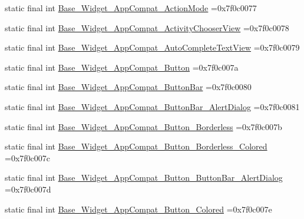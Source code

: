 \begin{DoxyCompactItemize}
\item 
static final int \mbox{\hyperlink{classbr_1_1unb_1_1cic_1_1mp_1_1marketmaster_1_1test_1_1R_1_1style_a55995a4583f924b91f4906774f512d5d}{Base\+\_\+\+Widget\+\_\+\+App\+Compat\+\_\+\+Action\+Mode}} =0x7f0c0077
\item 
static final int \mbox{\hyperlink{classbr_1_1unb_1_1cic_1_1mp_1_1marketmaster_1_1test_1_1R_1_1style_a267a3666f87776bc0512b00e93191914}{Base\+\_\+\+Widget\+\_\+\+App\+Compat\+\_\+\+Activity\+Chooser\+View}} =0x7f0c0078
\item 
static final int \mbox{\hyperlink{classbr_1_1unb_1_1cic_1_1mp_1_1marketmaster_1_1test_1_1R_1_1style_af5a89784aee8f12ae4f60f9d3be816c8}{Base\+\_\+\+Widget\+\_\+\+App\+Compat\+\_\+\+Auto\+Complete\+Text\+View}} =0x7f0c0079
\item 
static final int \mbox{\hyperlink{classbr_1_1unb_1_1cic_1_1mp_1_1marketmaster_1_1test_1_1R_1_1style_a5a38064a1f760f96a0865e2d7b9a7dd0}{Base\+\_\+\+Widget\+\_\+\+App\+Compat\+\_\+\+Button}} =0x7f0c007a
\item 
static final int \mbox{\hyperlink{classbr_1_1unb_1_1cic_1_1mp_1_1marketmaster_1_1test_1_1R_1_1style_a525de89adc90661cbf795bf72158d157}{Base\+\_\+\+Widget\+\_\+\+App\+Compat\+\_\+\+Button\+Bar}} =0x7f0c0080
\item 
static final int \mbox{\hyperlink{classbr_1_1unb_1_1cic_1_1mp_1_1marketmaster_1_1test_1_1R_1_1style_ae44658c3d7d5f4449ae26644ee1e8139}{Base\+\_\+\+Widget\+\_\+\+App\+Compat\+\_\+\+Button\+Bar\+\_\+\+Alert\+Dialog}} =0x7f0c0081
\item 
static final int \mbox{\hyperlink{classbr_1_1unb_1_1cic_1_1mp_1_1marketmaster_1_1test_1_1R_1_1style_a39ab6b7d3317e1f5e28e3bc9a770a8d1}{Base\+\_\+\+Widget\+\_\+\+App\+Compat\+\_\+\+Button\+\_\+\+Borderless}} =0x7f0c007b
\item 
static final int \mbox{\hyperlink{classbr_1_1unb_1_1cic_1_1mp_1_1marketmaster_1_1test_1_1R_1_1style_a39803577f8234d5b47a0d4446e20a478}{Base\+\_\+\+Widget\+\_\+\+App\+Compat\+\_\+\+Button\+\_\+\+Borderless\+\_\+\+Colored}} =0x7f0c007c
\item 
static final int \mbox{\hyperlink{classbr_1_1unb_1_1cic_1_1mp_1_1marketmaster_1_1test_1_1R_1_1style_a584cada44a7e84a88ff411937e2a0710}{Base\+\_\+\+Widget\+\_\+\+App\+Compat\+\_\+\+Button\+\_\+\+Button\+Bar\+\_\+\+Alert\+Dialog}} =0x7f0c007d
\item 
static final int \mbox{\hyperlink{classbr_1_1unb_1_1cic_1_1mp_1_1marketmaster_1_1test_1_1R_1_1style_a09b2e97f4b08c4907f6150490416f8f0}{Base\+\_\+\+Widget\+\_\+\+App\+Compat\+\_\+\+Button\+\_\+\+Colored}} =0x7f0c007e

\end{DoxyCompactItemize}
